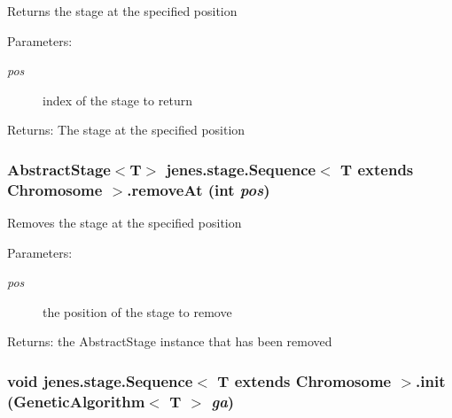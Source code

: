 Returns the stage at the specified position

\begin{Desc}
\item[Parameters:]
\begin{description}
\item[{\em pos}]index of the stage to return \end{description}
\end{Desc}
\begin{Desc}
\item[Returns:]The stage at the specified position \end{Desc}
\hypertarget{classjenes_1_1stage_1_1_sequence_3_01_t_01extends_01_chromosome_01_4_1336b162d37aaa9b402c49480d12f8ef}{
\subsubsection[removeAt]{\setlength{\rightskip}{0pt plus 5cm}AbstractStage$<$T$>$ jenes.stage.Sequence$<$ T extends Chromosome $>$.removeAt (int {\em pos})}}
\label{classjenes_1_1stage_1_1_sequence_3_01_t_01extends_01_chromosome_01_4_1336b162d37aaa9b402c49480d12f8ef}


Removes the stage at the specified position 

\begin{Desc}
\item[Parameters:]
\begin{description}
\item[{\em pos}]the position of the stage to remove \end{description}
\end{Desc}
\begin{Desc}
\item[Returns:]the AbstractStage instance that has been removed \end{Desc}
\hypertarget{classjenes_1_1stage_1_1_sequence_3_01_t_01extends_01_chromosome_01_4_98d9ad6e0fdc1547971fe7fce029e25f}{
\subsubsection[init]{\setlength{\rightskip}{0pt plus 5cm}void jenes.stage.Sequence$<$ T extends Chromosome $>$.init (GeneticAlgorithm$<$ T $>$ {\em ga})}}
\label{classjenes_1_1stage_1_1_sequence_3_01_t_01extends_01_chromosome_01_4_98d9ad6e0fdc1547971fe7fce029e25f}


